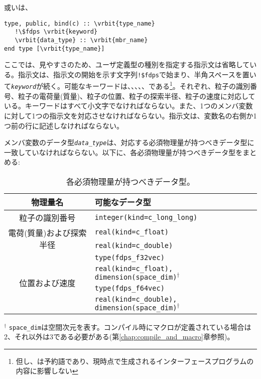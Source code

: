 或いは、

\begin{screen}
\begin{Verbatim}[commandchars=\\\{\}]
type, public, bind(c) :: \vrbit{type_name}
   !\$fdps \vrbit{keyword}
   \vrbit{data_type} :: \vrbit{mbr_name} 
end type [\vrbit{type_name}]
\end{Verbatim}
\end{screen}
ここでは、見やすさのため、ユーザ定義型の種別を指定する指示文は省略している。指示文は、指示文の開始を示す文字列\verb|!$fdps|で始まり、半角スペースを置いて\textit{\texttt{keyword}}が続く。可能なキーワードは、、、、、である\footnote{但し、は予約語であり、現時点で生成されるインターフェースプログラムの内容に影響しない}。それぞれ、粒子の識別番号、粒子の電荷量(質量)、粒子の位置、粒子の探索半径、粒子の速度に対応している。キーワードはすべて小文字でなければならない。また、1つのメンバ変数に対して1つの指示文を対応させなければならない。指示文は、変数名の右側か1つ前の行に記述しなければならない。

メンバ変数のデータ型\textit{\texttt{data\_type}}は、対応する必須物理量が持つべきデータ型に一致していなければならない。以下に、各必須物理量が持つべきデータ型をまとめる:
\begin{table}[H]
\begin{tabularx}{\linewidth}{cX}
\toprule
\rowcolor{Snow2}
物理量名 & 可能なデータ型 \\
\midrule
粒子の識別番号 & \texttt{integer(kind=c\_long\_long)} \\
\midrule
\multirow{2}{*}{電荷(質量)および探索半径} & \texttt{real(kind=c\_float)} \\
 & \texttt{real(kind=c\_double)} \\
\midrule
\multirow{4}{*}{位置および速度} & \texttt{type(fdps\_f32vec)} \\
& \texttt{real(kind=c\_float), dimension(space\_dim)}$^{\dagger}$ \\
& \texttt{type(fdps\_f64vec)} \\
& \texttt{real(kind=c\_double), dimension(space\_dim)}$^{\dagger}$ \\
\bottomrule
\end{tabularx}
\begin{flushleft}
$^{\dagger}$ \texttt{space\_dim}は空間次元を表す。コンパイル時にマクロが定義されている場合は2、それ以外は3である必要がある(第\ref{chap:compile_and_macro}章参照)。
\end{flushleft}
\caption{各必須物理量が持つべきデータ型。}
\end{table}


